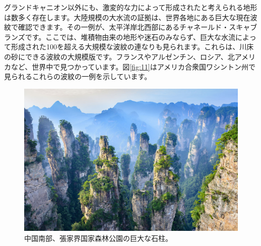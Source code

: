 \documentclass[10pt,twocolumn,letterpaper]{article}
\begin{document}
グランドキャニオン以外にも、激変的な力によって形成されたと考えられる地形は数多く存在します。大陸規模の大水流の証拠は、世界各地にある巨大な現在波紋で確認できます。その一例が、太平洋岸北西部にあるチャネールド・スキャブランズです。ここでは、堆積物由来の地形や迷石のみならず、巨大な水流によって形成された100を超える大規模な波紋の連なりも見られます\cite{78,79}。これらは、川床の砂にできる波紋の大規模版です。フランスやアルゼンチン、ロシア、北アメリカなど、世界中で見つかっています\cite{81}。図\ref{fig:11}はアメリカ合衆国ワシントン州で見られるこれらの波紋の一例を示しています\cite{80}。
\begin{figure}[b]
\begin{center}
   \includegraphics[width=1\linewidth]{zhangjiajie.jpg}
\end{center}
   \caption{中国南部、張家界国家森林公園の巨大な石柱。}
\label{fig:12}
\label{fig:onecol}
\end{figure}
\end{document}
